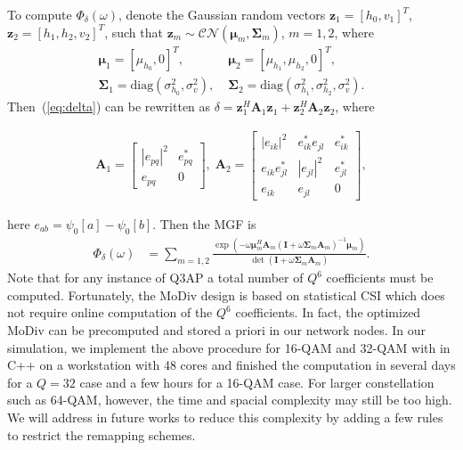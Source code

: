 \documentclass[journal,draftcls,onecolumn,12pt,twoside]{IEEEtran}
\begin{document}
To compute $\Phi_{\delta}(\omega)$, denote the Gaussian random vectors
$\mathbf{z}_1 = [h_0, v_1]^T$, $\mathbf{z}_{2} = [h_1, h_2, v_2]^T$, such
that $\mathbf{z}_m\sim\mathcal{CN}(\bm{\mu}_m, \mathbf{\Sigma}_m)$, $m=1,2$,
where
\begin{align}
    \bm{\mu}_1 = [\mu_{h_0}, 0]^T,& \; \bm{\mu}_{2} = [\mu_{h_1}, \mu_{h_2},
    0]^T,
    \\
    \mathbf{\Sigma}_1 = \mbox{diag}\left(\sigma_{h_0}^2, \sigma_v^2\right), & \;
    \mathbf{\Sigma}_2 = \mbox{diag}\left(\sigma_{h_1}^2, \sigma_{h_2}^2,
    \sigma_v^2\right).
\end{align}
Then~(\ref{eq:delta}) can be rewritten as $\delta =
\mathbf{z}_1^H\mathbf{A}_1\mathbf{z}_1 +
\mathbf{z}_{2}^H\mathbf{A}_{2}\mathbf{z}_{2}$, where

\begin{align}
    \mathbf{A}_1 = \left[
        \begin{array}{cc}
            |e_{pq}|^2  & e_{pq}^* \\
            e_{pq} & 0
        \end{array}
    \right], \;
    \mathbf{A}_2 = \left[
        \begin{array}{ccc}
        |e_{ik}|^2 & e_{ik}^*e_{jl} & e_{ik}^*
        \\
        e_{ik}e_{jl}^* & |e_{jl}|^2 & e_{jl}^*
        \\
        e_{ik} & e_{jl} & 0
    \end{array}
    \right],
\end{align}

here $e_{ab} = \psi_0[a] - \psi_0[b]$. Then the MGF
is
\begin{align}
    \Phi_{\delta}(\omega) & = \sum_{m=1,2}
    \frac{\exp(-\omega\bm{\mu}_m^H\mathbf{A}_m(\mathbf{I} +
    \omega\mathbf{\Sigma}_m\mathbf{A}_m)^{-1}\bm{\mu}_m)}{\det(\mathbf{I} +
    \omega\mathbf{\Sigma}_m\mathbf{A}_m)}.
\end{align}
Note that for any instance of Q3AP a total number of $Q^6$ coefficients must be
computed. Fortunately, the MoDiv design is based on statistical CSI which does
not require online computation of the $Q^6$ coefficients. In fact, the optimized
MoDiv can be precomputed and stored a priori in our network nodes. In our
simulation, we implement the above procedure for 16-QAM and 32-QAM with in C++
on a workstation with 48 cores and finished the computation in several days for
a $Q=32$ case and a few hours for a 16-QAM case. For larger constellation such
as 64-QAM, however, the time and spacial complexity may still be too high. We
will address in future works to reduce this complexity by adding a few rules to
restrict the remapping schemes.
\end{document}
